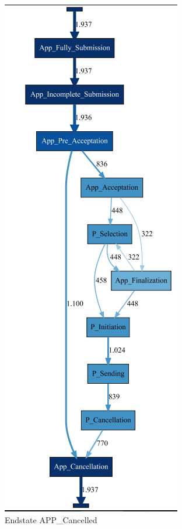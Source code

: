 \begin{figure}[!htbp]
\begin{subfigure}{.3\textwidth}
\includegraphics[height=0.3\textheight]{APP_CancDFG0-1.PNG}
\caption{Endstate APP\_Cancelled}
\label{fig:CancModel}
\end{subfigure}
\begin{subfigure}{.3\textwidth}

\end{subfigure}
\end{figure}
